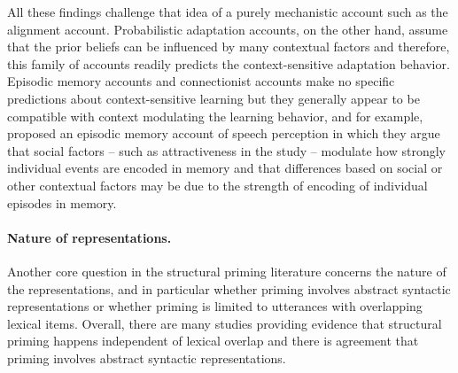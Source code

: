 
All these findings challenge that idea of a purely mechanistic account such as the alignment account. Probabilistic adaptation accounts, on the other hand, assume
that the prior beliefs can be influenced by many contextual factors and therefore, this family of accounts readily predicts the context-sensitive adaptation behavior.
Episodic memory accounts and connectionist accounts make no specific predictions about context-sensitive learning but they generally appear to be compatible with context
modulating the learning behavior, and for example, \cite{SumnerKataoka2013, Sumner2014} proposed an episodic memory account of speech perception in which they argue
 that social factors -- such as attractiveness in the \cite{Babel2012}  study -- modulate how strongly individual events are encoded in memory and that differences based on social
 or other contextual factors may be due to the strength of encoding of individual episodes in memory.
 
\paragraph{Nature of representations.} Another core question in the structural priming literature concerns
the nature of the representations, and in particular whether priming involves abstract syntactic representations
or whether priming is limited to utterances with overlapping lexical items. Overall, there are many studies
providing evidence that structural priming happens independent of lexical overlap and there is agreement
that priming involves abstract syntactic representations.


